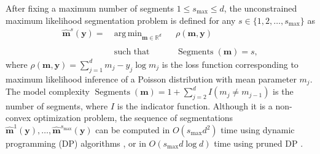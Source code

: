 \documentclass{article}
\DeclareMathOperator*{\argmin}{arg\,min}
\DeclareMathOperator*{\Segments}{Segments}
\newcommand{\RR}{\mathbb R}
\begin{document}
After fixing a maximum number of segments $1 \leq s_{\text{max}}\leq d$,
the unconstrained maximum likelihood segmentation problem is defined
for any $s\in\{1, 2, \dots, s_{\max}\}$ as
\begin{equation}
  \label{argmin:unconstrained}
  \begin{aligned}
    \mathbf{\hat m}^s(\mathbf y)  =\ 
    &\argmin_{\mathbf m\in\RR^{d}} && 
    \rho
    (\mathbf m, \mathbf y) \\
    \\
    &\text{such that} && \Segments(\mathbf m)=s,
  \end{aligned}
\end{equation}
where $\rho(\mathbf m, \mathbf y)= \sum_{j=1}^d m_j - y_j \log m_j$ is
the loss function corresponding to maximum likelihood inference of a
Poisson distribution with mean parameter $m_j$. The model complexity
$\Segments(\mathbf m)=1+\sum_{j=2}^d I(m_j \neq m_{j-1})$ is the
number of segments, where $I$ is the indicator function. Although it
is a non-convex optimization problem, the sequence of segmentations
$\mathbf{\hat m}^1(\mathbf y), \dots, \mathbf{\hat
  m}^{s_{\text{max}}}(\mathbf y)$ can be computed in $O(s_{\text{max}}
d^2)$ time using dynamic programming (DP) algorithms \citep{bellman},
or in $O(s_{\text{max}} d \log d)$ time using pruned DP
\citep{pruned-dp, Segmentor}.
\end{document}
